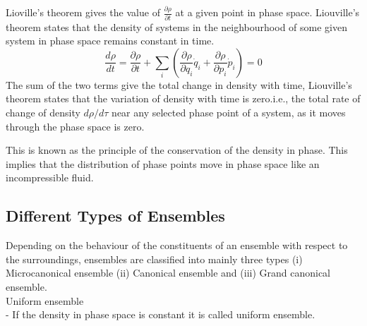 Lioville's theorem gives the value of $\frac{\partial \rho}{\partial t}$ at a given point in phase space.
Liouville's theorem states that the density of systems in the neighbourhood of some given system in phase space remains constant in time.
\begin{equation}
\frac{d \rho}{d t}=\frac{\partial \rho}{\partial t}+\sum_{i}\left(\frac{\partial \rho}{\partial q_{i}} \dot{q}_{i}+\frac{\partial \rho}{\partial p_{i}} \dot{p}_{i}\right)=0
\end{equation}
The sum of the two terms give the total change in density with time, Liouville's theorem states that the variation of density with time is zero.i.e., the total rate of change of density $d\rho/d\tau$ near any selected phase point of a system, as it moves through the phase space is zero.

This is known as the principle of the conservation of the density in phase.  This implies that the distribution of phase points move in phase space like an incompressible fluid.\\
\subsection{Different Types of Ensembles}
Depending on the behaviour of the constituents of an ensemble with respect to the surroundings, ensembles are classified into mainly three types (i) Microcanonical ensemble (ii) Canonical ensemble and (iii) Grand canonical ensemble.\\
Uniform ensemble\\
- If the density in phase space is constant it is called uniform ensemble.
